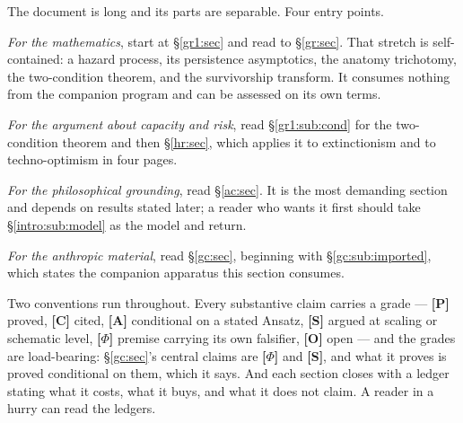 \documentclass[11pt]{article}
\numberwithin{equation}{section}
\theoremstyle{plain}
\theoremstyle{definition}
\theoremstyle{remark}
\begin{document}
The document is long and its parts are separable. Four entry points.

\emph{For the mathematics}, start at \S\ref{gr1:sec} and read to
\S\ref{gr:sec}. That stretch is self-contained: a hazard process, its
persistence asymptotics, the anatomy trichotomy, the two-condition
theorem, and the survivorship transform. It consumes nothing from the
companion program and can be assessed on its own terms.

\emph{For the argument about capacity and risk}, read
\S\ref{gr1:sub:cond} for the two-condition theorem and then
\S\ref{hr:sec}, which applies it to extinctionism and to
techno-optimism in four pages.

\emph{For the philosophical grounding}, read \S\ref{ac:sec}. It is the
most demanding section and depends on results stated later; a reader who
wants it first should take \S\ref{intro:sub:model} as the model and
return.

\emph{For the anthropic material}, read \S\ref{gc:sec}, beginning with
\S\ref{gc:sub:imported}, which states the companion apparatus this
section consumes.

Two conventions run throughout. Every substantive claim carries a grade
--- \textbf{[P]} proved, \textbf{[C]} cited, \textbf{[A]} conditional on a
stated Ansatz, \textbf{[S]} argued at scaling or schematic level,
\textbf{[$\Phi$]} premise carrying its own falsifier, \textbf{[O]} open --- and the grades are load-bearing:
\S\ref{gc:sec}'s central claims are \textbf{[$\Phi$]} and \textbf{[S]},
and what it proves is proved conditional on them, which it says. And each
section closes with a ledger stating what it costs, what it buys, and
what it does not claim. A reader in a hurry can read the ledgers.


%
\end{document}
